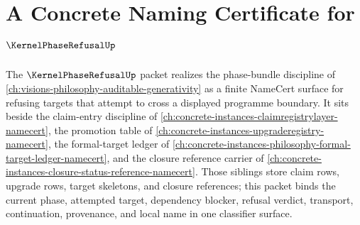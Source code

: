 \chapter{A Concrete Naming Certificate for $\KernelPhaseRefusalUp$}
\label{ch:concrete-instances-kernelphaserefusal-namecert}

The $\KernelPhaseRefusalUp$ packet realizes the phase-bundle discipline of \autoref{ch:visions-philosophy-auditable-generativity} as a finite NameCert surface for refusing targets that attempt to cross a displayed programme boundary. It sits beside the claim-entry discipline of \autoref{ch:concrete-instances-claimregistrylayer-namecert}, the promotion table of \autoref{ch:concrete-instances-upgraderegistry-namecert}, the formal-target ledger of \autoref{ch:concrete-instances-philosophy-formal-target-ledger-namecert}, and the closure reference carrier of \autoref{ch:concrete-instances-closure-status-reference-namecert}. Those siblings store claim rows, upgrade rows, target skeletons, and closure references; this packet binds the current phase, attempted target, dependency blocker, refusal verdict, transport, continuation, provenance, and local name in one classifier surface.

